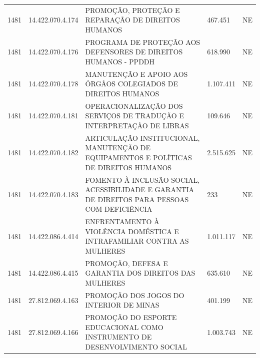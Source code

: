 \documentclass{article}
\begin{document}
\begin{longtable}[c]{m{1cm}|m{2cm}|m{10cm}|m{2cm}|m{1cm}}
\multicolumn{1}{C{1cm}|}{1481} & \multicolumn{1}{C{2cm}|}{14.422.070.4.174} & \multicolumn{1}{L{10cm}|}{PROMOÇÃO, PROTEÇÃO E REPARAÇÃO DE DIREITOS HUMANOS} & \multicolumn{1}{R{2cm}|}{467.451} & \multicolumn{1}{C{1cm}}{NE} \\
\multicolumn{1}{C{1cm}|}{1481} & \multicolumn{1}{C{2cm}|}{14.422.070.4.176} & \multicolumn{1}{L{10cm}|}{PROGRAMA DE PROTEÇÃO AOS DEFENSORES DE DIREITOS HUMANOS - PPDDH} & \multicolumn{1}{R{2cm}|}{618.990} & \multicolumn{1}{C{1cm}}{NE} \\
\multicolumn{1}{C{1cm}|}{1481} & \multicolumn{1}{C{2cm}|}{14.422.070.4.178} & \multicolumn{1}{L{10cm}|}{MANUTENÇÃO E APOIO AOS ÓRGÃOS COLEGIADOS DE DIREITOS HUMANOS} & \multicolumn{1}{R{2cm}|}{1.107.411} & \multicolumn{1}{C{1cm}}{NE} \\
\multicolumn{1}{C{1cm}|}{1481} & \multicolumn{1}{C{2cm}|}{14.422.070.4.181} & \multicolumn{1}{L{10cm}|}{OPERACIONALIZAÇÃO DOS SERVIÇOS DE TRADUÇÃO E INTERPRETAÇÃO DE LIBRAS} & \multicolumn{1}{R{2cm}|}{109.646} & \multicolumn{1}{C{1cm}}{NE} \\
\multicolumn{1}{C{1cm}|}{1481} & \multicolumn{1}{C{2cm}|}{14.422.070.4.182} & \multicolumn{1}{L{10cm}|}{ARTICULAÇÃO INSTITUCIONAL, MANUTENÇÃO DE EQUIPAMENTOS E POLÍTICAS DE DIREITOS HUMANOS} & \multicolumn{1}{R{2cm}|}{2.515.625} & \multicolumn{1}{C{1cm}}{NE} \\
\multicolumn{1}{C{1cm}|}{1481} & \multicolumn{1}{C{2cm}|}{14.422.070.4.183} & \multicolumn{1}{L{10cm}|}{FOMENTO À INCLUSÃO SOCIAL, ACESSIBILIDADE E GARANTIA DE DIREITOS PARA PESSOAS COM DEFICIÊNCIA} & \multicolumn{1}{R{2cm}|}{233} & \multicolumn{1}{C{1cm}}{NE} \\
\multicolumn{1}{C{1cm}|}{1481} & \multicolumn{1}{C{2cm}|}{14.422.086.4.414} & \multicolumn{1}{L{10cm}|}{ENFRENTAMENTO À VIOLÊNCIA DOMÉSTICA E INTRAFAMILIAR CONTRA AS MULHERES} & \multicolumn{1}{R{2cm}|}{1.011.117} & \multicolumn{1}{C{1cm}}{NE} \\
\multicolumn{1}{C{1cm}|}{1481} & \multicolumn{1}{C{2cm}|}{14.422.086.4.415} & \multicolumn{1}{L{10cm}|}{PROMOÇÃO, DEFESA E GARANTIA DOS DIREITOS DAS MULHERES} & \multicolumn{1}{R{2cm}|}{635.610} & \multicolumn{1}{C{1cm}}{NE} \\
\multicolumn{1}{C{1cm}|}{1481} & \multicolumn{1}{C{2cm}|}{27.812.069.4.163} & \multicolumn{1}{L{10cm}|}{PROMOÇÃO DOS JOGOS DO INTERIOR DE MINAS} & \multicolumn{1}{R{2cm}|}{401.199} & \multicolumn{1}{C{1cm}}{NE} \\
\multicolumn{1}{C{1cm}|}{1481} & \multicolumn{1}{C{2cm}|}{27.812.069.4.166} & \multicolumn{1}{L{10cm}|}{PROMOÇÃO DO ESPORTE EDUCACIONAL COMO INSTRUMENTO DE DESENVOLVIMENTO SOCIAL} & \multicolumn{1}{R{2cm}|}{1.003.743} & \multicolumn{1}{C{1cm}}{NE} \\

\end{longtable}
\end{document}
